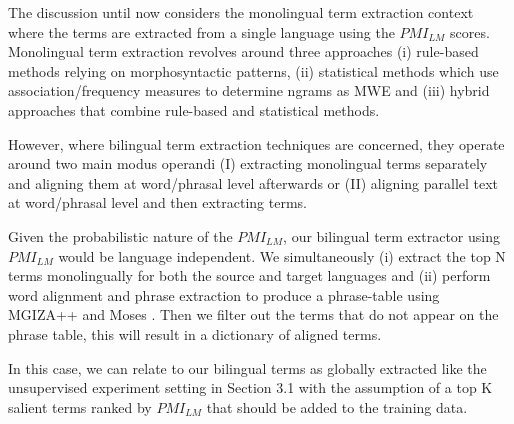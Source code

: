 The discussion until now considers the monolingual term extraction context where the terms are extracted from a single language using the $PMI_{LM}$ scores. Monolingual term extraction revolves around three approaches (i) rule-based methods relying on morphosyntactic patterns, (ii) statistical methods which use association/frequency measures to determine ngrams as MWE and (iii) hybrid approaches that combine rule-based and statistical methods. 

However, where bilingual term extraction techniques are concerned, they operate around two main modus operandi (I) extracting monolingual terms separately and aligning them at word/phrasal level afterwards or (II) aligning parallel text at word/phrasal level and then extracting terms. 



Given the probabilistic nature of the $PMI_{LM}$, our bilingual term extractor using $PMI_{LM}$ would be language independent. We simultaneously (i) extract the top N terms monolingually for both the source and target languages  and (ii) perform word alignment and phrase extraction to produce a phrase-table using MGIZA++ and Moses \citep{koehn2003statistical,och2003systematic,gao2008parallel}. Then we filter out the terms that do not appear on the phrase table, this will result in a dictionary of aligned terms. 

In this case, we can relate to our bilingual terms as globally extracted like the unsupervised experiment setting in Section 3.1 with the assumption of a top K salient terms ranked by $PMI_{LM}$ that should be added to the training data. 


